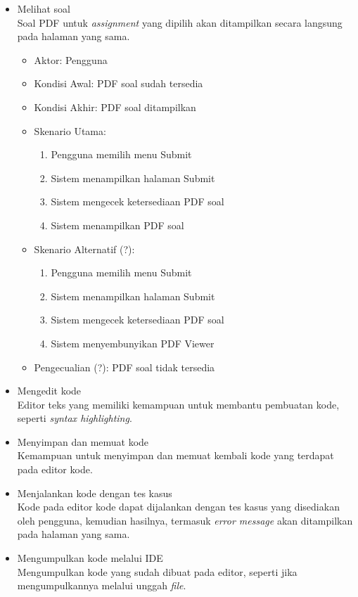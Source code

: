 \begin{itemize}
    \item Melihat soal \\ Soal PDF untuk \textit{assignment} yang dipilih akan ditampilkan secara langsung pada halaman yang sama.
    \begin{itemize}
            \item Aktor: Pengguna
            \item Kondisi Awal: PDF soal sudah tersedia
            \item Kondisi Akhir: PDF soal ditampilkan
            \item Skenario Utama:
                \begin{enumerate}
                    \item Pengguna memilih menu Submit
                    \item Sistem menampilkan halaman Submit
                    \item Sistem mengecek ketersediaan PDF soal
                    \item Sistem menampilkan PDF soal
                \end{enumerate}
            \item Skenario Alternatif (?):
                \begin{enumerate}
                    \item Pengguna memilih menu Submit
                    \item Sistem menampilkan halaman Submit
                    \item Sistem mengecek ketersediaan PDF soal
                    \item Sistem menyembunyikan PDF Viewer
                \end{enumerate}
            \item Pengecualian (?): PDF soal tidak tersedia
    \end{itemize}
    \item Mengedit kode \\ Editor teks yang memiliki kemampuan untuk membantu pembuatan kode, seperti \textit{syntax highlighting}.
    \item Menyimpan dan memuat kode \\ Kemampuan untuk menyimpan dan memuat kembali kode yang terdapat pada editor kode.
    \item Menjalankan kode dengan tes kasus \\  Kode pada editor kode dapat dijalankan dengan tes kasus yang disediakan oleh pengguna, kemudian hasilnya, termasuk \textit{error message} akan ditampilkan pada halaman yang sama.
    \item Mengumpulkan kode melalui IDE \\  Mengumpulkan kode yang sudah dibuat pada editor, seperti jika mengumpulkannya melalui unggah \textit{file}.
\end{itemize}